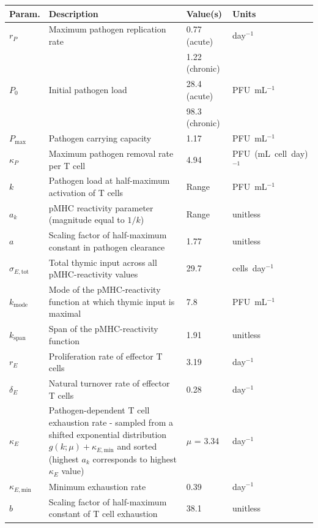 \begin{table}[ht]
\footnotesize
\centering
\begin{tabular}{p{} p{} p{} p{}}
    \hline
    \textbf{Param.} & \textbf{Description}                                             & \textbf{Value(s)} & \textbf{Units} \\
    \hline
    $r_P$ & Maximum pathogen replication rate & 0.77 (acute) & day$^{-1}$ \\
    & & 1.22 (chronic) & \\
    $P_0$ & Initial pathogen load & 28.4 (acute) & PFU~mL$^{-1}$ \\
    & & 98.3 (chronic) & \\
    $P_{\textrm{max}}$ & Pathogen carrying capacity & 1.17\E{5} & PFU~mL$^{-1}$ \\
    $\kappa_P$ & Maximum pathogen removal rate per T cell & 4.94\E{-2} & PFU~(mL~cell~day)$^{-1}$ \\
    $k$ & Pathogen load at half-maximum activation of T cells & Range & PFU~mL$^{-1}$ \\
    $a_k$ & pMHC reactivity parameter (magnitude equal to $1/k$) & Range & unitless \\
    $a$ & Scaling factor of half-maximum constant in pathogen clearance & 1.77\E{-3} & unitless \\
    $\sigma_{E,\textrm{tot}}$ & Total thymic input across all pMHC-reactivity values & 29.7 & cells~day$^{-1}$\\
    $k_{\textrm{mode}}$ & Mode of the pMHC-reactivity function at which thymic input is maximal &  7.8\E{2} & PFU~mL$^{-1}$ \\
    $k_{\textrm{span}}$ & Span of the pMHC-reactivity function & 1.91 & unitless \\
    $r_E$ & Proliferation rate of effector T cells & 3.19 & day$^{-1}$ \\
    $\delta_E$ & Natural turnover rate of effector T cells & 0.28 & day$^{-1}$ \\
    $\kappa_E$ & Pathogen-dependent T cell exhaustion rate - sampled from a shifted exponential distribution $g(k;\mu) + \kappa_{E,\textrm{min}}$ and sorted (highest $a_k$ corresponds to highest $\kappa_E$ value) & $\mu$ = 3.34 & day$^{-1}$ \\
    $\kappa_{E,\textrm{min}}$ & Minimum exhaustion rate & 0.39 & day$^{-1}$ \\
    $b$ & Scaling factor of half-maximum constant of T cell exhaustion & 38.1 & unitless \\

\end{tabular}
\end{table}
